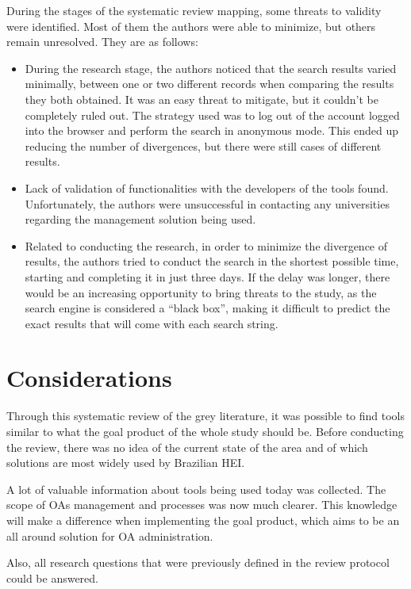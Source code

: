 During the stages of the systematic review mapping, some threats to validity were identified. Most of them the authors were able to minimize, but others remain unresolved. They are as follows:
\begin{itemize}
  \item During the research stage, the authors noticed that the search results varied minimally, between one or two different records when comparing the results they both obtained. It was an easy threat to mitigate, but it couldn't be completely ruled out. The strategy used was to log out of the account logged into the browser and perform the search in anonymous mode. This ended up reducing the number of divergences, but there were still cases of different results.
  \item Lack of validation of functionalities with the developers of the tools found. Unfortunately, the authors were unsuccessful in contacting any universities regarding the management solution being used.
  \item Related to conducting the research, in order to minimize the divergence of results, the authors tried to conduct the search in the shortest possible time, starting and completing it in just three days. If the delay was longer, there would be an increasing opportunity to bring threats to the study, as the search engine is considered a ``black box'', making it difficult to predict the exact results that will come with each search string.
\end{itemize}

\section{Considerations}\label{sec:gl-considerations}

Through this systematic review of the grey literature, it was possible to find tools similar to what the goal product of the whole study should be. Before conducting the review, there was no idea of the current state of the area and of which solutions are most widely used by Brazilian \ac{HEI}.

A lot of valuable information about tools being used today was collected. The scope of \aclp{OA} management and processes was now much clearer. This knowledge will make a difference when implementing the goal product, which aims to be an all around solution for \ac{OA} administration.

Also, all research questions that were previously defined in the review protocol could be answered.